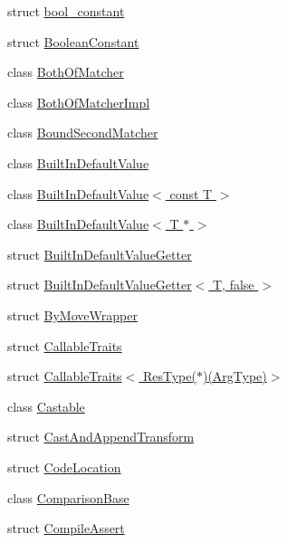 \begin{DoxyCompactItemize}
\item 
struct \hyperlink{structtesting_1_1internal_1_1bool__constant}{bool\+\_\+constant}
\item 
struct \hyperlink{structtesting_1_1internal_1_1BooleanConstant}{Boolean\+Constant}
\item 
class \hyperlink{classtesting_1_1internal_1_1BothOfMatcher}{Both\+Of\+Matcher}
\item 
class \hyperlink{classtesting_1_1internal_1_1BothOfMatcherImpl}{Both\+Of\+Matcher\+Impl}
\item 
class \hyperlink{classtesting_1_1internal_1_1BoundSecondMatcher}{Bound\+Second\+Matcher}
\item 
class \hyperlink{classtesting_1_1internal_1_1BuiltInDefaultValue}{Built\+In\+Default\+Value}
\item 
class \hyperlink{classtesting_1_1internal_1_1BuiltInDefaultValue_3_01const_01T_01_4}{Built\+In\+Default\+Value$<$ const T $>$}
\item 
class \hyperlink{classtesting_1_1internal_1_1BuiltInDefaultValue_3_01T_01_5_01_4}{Built\+In\+Default\+Value$<$ T $\ast$ $>$}
\item 
struct \hyperlink{structtesting_1_1internal_1_1BuiltInDefaultValueGetter}{Built\+In\+Default\+Value\+Getter}
\item 
struct \hyperlink{structtesting_1_1internal_1_1BuiltInDefaultValueGetter_3_01T_00_01false_01_4}{Built\+In\+Default\+Value\+Getter$<$ T, false $>$}
\item 
struct \hyperlink{structtesting_1_1internal_1_1ByMoveWrapper}{By\+Move\+Wrapper}
\item 
struct \hyperlink{structtesting_1_1internal_1_1CallableTraits}{Callable\+Traits}
\item 
struct \hyperlink{structtesting_1_1internal_1_1CallableTraits_3_01ResType_07_5_08_07ArgType_08_4}{Callable\+Traits$<$ Res\+Type($\ast$)(\+Arg\+Type)$>$}
\item 
class \hyperlink{classtesting_1_1internal_1_1Castable}{Castable}
\item 
struct \hyperlink{structtesting_1_1internal_1_1CastAndAppendTransform}{Cast\+And\+Append\+Transform}
\item 
struct \hyperlink{structtesting_1_1internal_1_1CodeLocation}{Code\+Location}
\item 
class \hyperlink{classtesting_1_1internal_1_1ComparisonBase}{Comparison\+Base}
\item 
struct \hyperlink{structtesting_1_1internal_1_1CompileAssert}{Compile\+Assert}
\item 

\end{DoxyCompactItemize}
